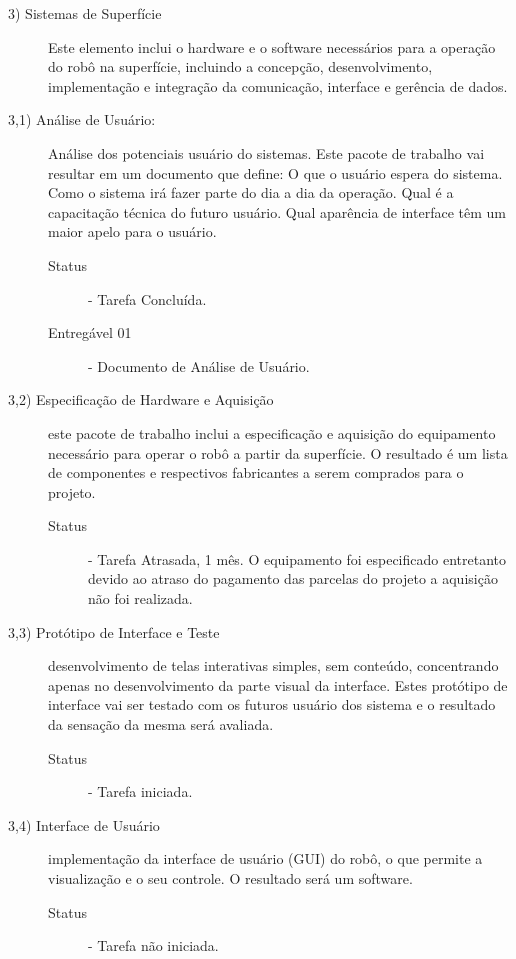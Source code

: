 \begin{description}

\vspace{0,5cm}

\item[3) Sistemas de Superfície] Este elemento inclui o hardware e o software necessários para a operação do robô na superfície, incluindo a concepção, desenvolvimento, implementação e integração da comunicação, interface e gerência de dados. 

\item[3,1) Análise de Usuário:] Análise dos potenciais usuário do sistemas. Este pacote de trabalho vai resultar em um documento que define: O que o usuário espera do sistema. Como o sistema irá fazer parte do dia a dia da operação. Qual é a capacitação técnica do futuro usuário. Qual aparência de interface têm um maior apelo para o usuário.

\begin{description}
	\item [Status] - Tarefa Concluída. 
	\item [Entregável 01] - Documento de Análise de Usuário.
\end{description} 

\item[3,2) Especificação de Hardware e Aquisição] este pacote de trabalho inclui a especificação e aquisição do equipamento necessário para operar o robô a partir da superfície. O resultado é um lista de componentes e respectivos fabricantes a serem comprados para o projeto. 

\begin{description}
	\item [Status] - Tarefa Atrasada, 1 mês. O equipamento foi especificado entretanto devido ao atraso do pagamento das parcelas do projeto a aquisição não foi realizada. 
\end{description} 


\item[3,3) Protótipo de Interface e Teste] desenvolvimento de telas interativas simples, sem conteúdo, concentrando apenas no desenvolvimento da parte visual da interface. Estes protótipo de interface vai ser testado com os futuros usuário dos sistema e o resultado da sensação da mesma será avaliada.

\begin{description}
	\item [Status] - Tarefa iniciada. 
\end{description} 

\item[3,4) Interface de Usuário] implementação da interface de usuário (GUI) do robô, o que permite a visualização e o seu controle. O resultado será um software. 

\begin{description}
	\item [Status] - Tarefa não iniciada. 
\end{description} 


\end{description}